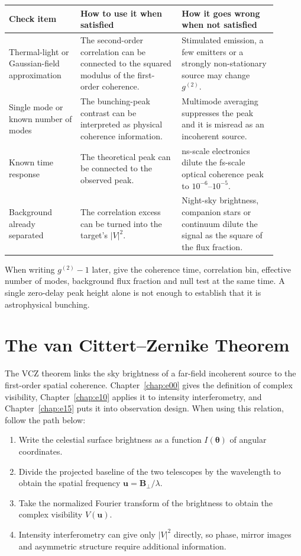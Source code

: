 \begin{longtable}{p{0.24\linewidth}p{0.34\linewidth}p{0.32\linewidth}}
\toprule
Check item & How to use it when satisfied & How it goes wrong when not satisfied \\
\midrule
Thermal-light or Gaussian-field approximation & The second-order correlation can be connected to the squared modulus of the first-order coherence. & Stimulated emission, a few emitters or a strongly non-stationary source may change \(g^{(2)}\). \\
Single mode or known number of modes & The bunching-peak contrast can be interpreted as physical coherence information. & Multimode averaging suppresses the peak and it is misread as an incoherent source. \\
Known time response & The theoretical peak can be connected to the observed peak. & ns-scale electronics dilute the fs-scale optical coherence peak to \(10^{-6}\)--\(10^{-5}\). \\
Background already separated & The correlation excess can be turned into the target's \(|V|^2\). & Night-sky brightness, companion stars or continuum dilute the signal as the square of the flux fraction. \\
\bottomrule
\end{longtable}

When writing \(g^{(2)}-1\) later, give the coherence time, correlation bin, effective number of modes, background flux fraction and null test at the same time. A single zero-delay peak height alone is not enough to establish that it is astrophysical bunching.

\section{The van Cittert--Zernike Theorem}
\label{appsec:d-vcz}

The VCZ theorem links the sky brightness of a far-field incoherent source to the first-order spatial coherence. Chapter~\ref{chap:e00} gives the definition of complex visibility, Chapter~\ref{chap:e10} applies it to intensity interferometry, and Chapter~\ref{chap:e15} puts it into observation design. When using this relation, follow the path below:

\begin{enumerate}[leftmargin=*]
\item Write the celestial surface brightness as a function \(I(\boldsymbol\theta)\) of angular coordinates.
\item Divide the projected baseline of the two telescopes by the wavelength to obtain the spatial frequency \(\boldsymbol u=\boldsymbol B_\perp/\lambda\).
\item Take the normalized Fourier transform of the brightness to obtain the complex visibility \(V(\boldsymbol u)\).
\item Intensity interferometry can give only \(|V|^2\) directly, so phase, mirror images and asymmetric structure require additional information.
\end{enumerate}

